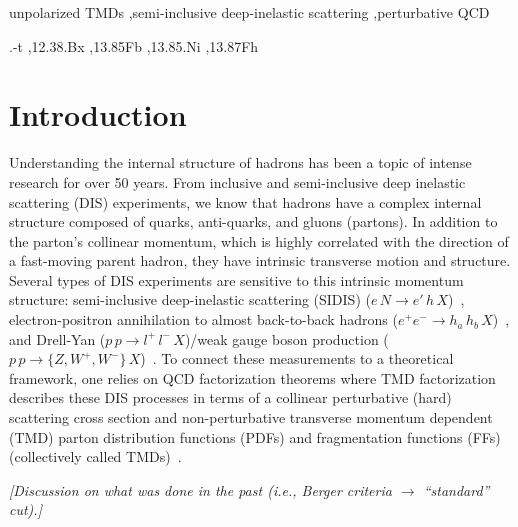 \documentclass[final,3p,times,onecolumn,sort&compress,hidelinks]{elsarticle}
\newcommand\3[1]{\boldsymbol{#1}}
\begin{document}
\begin{frontmatter}
\begin{keyword}
unpolarized TMDs \sep semi-inclusive deep-inelastic scattering \sep perturbative QCD

.-t \sep 12.38.Bx \sep  13.85Fb \sep 13.85.Ni \sep 13.87Fh


\end{keyword}

\end{frontmatter}


\date{\today}



\section{Introduction}
\label{s:intro}
Understanding the internal structure of hadrons has been a topic of intense research for over 50 years.  From inclusive and semi-inclusive deep inelastic scattering (DIS) experiments, we know that hadrons  have a complex internal structure
composed of quarks, anti-quarks, and gluons (partons). In addition to the parton's  collinear momentum, which is highly correlated  with the direction of a fast-moving parent hadron, they 
have intrinsic transverse motion and structure. Several types of DIS experiments are sensitive to this intrinsic momentum structure: semi-inclusive deep-inelastic scattering (SIDIS) ($e\,N\to e'\,h\,X$)~\cite{Kotzinian:1994dv}, electron-positron annihilation to almost back-to-back hadrons ($e^+e^-\to h_a\,h_b\,X$)~\cite{Boer:1997mf}, and Drell-Yan ($p\,p\to l^+\,l^-\,X$)/weak gauge boson production ($p\,p\to \{Z, W^+, W^-\}\,X$)~\cite{Tangerman:1994eh}. To connect these measurements  to a theoretical framework, 
one relies on QCD factorization theorems where
TMD factorization~\cite{Collins:1981uw,Ji:2004wu,Collins:2011zzd}
describes these DIS processes in terms of  a collinear perturbative (hard) scattering cross section and  non-perturbative 
transverse momentum dependent (TMD)
 parton distribution functions (PDFs) and fragmentation functions (FFs) (collectively called TMDs)~\cite{Kotzinian:1994dv,Mulders:1995dh,Boer:1997nt}. 

\begin{flushleft}
{\em [Discussion on what was done in the past (i.e., Berger criteria $\to$ ``standard'' cut).]}
\end{flushleft}
 
\end{document}
